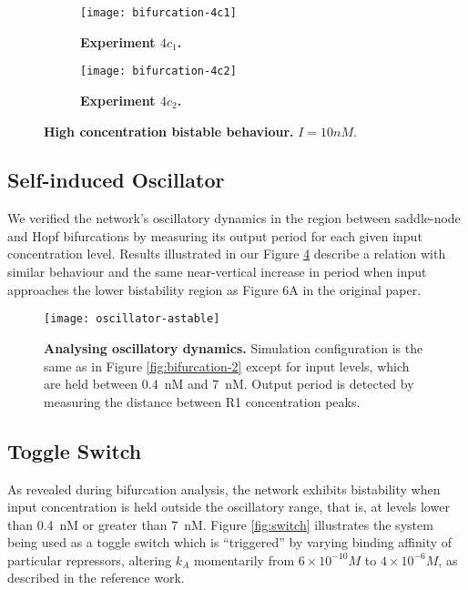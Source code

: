     \begin{figure}[!htb]
      \centering
      \begin{subfigure}[t]{0.45\textwidth}
        \centering
        \texttt{[image: bifurcation-4c1]}
        \caption{\textbf{Experiment $4c_{1}$.}}
        \label{fig:bifurcation-4c1}
      \end{subfigure}
      \hfill
      \begin{subfigure}[t]{0.45\textwidth}
        \centering
        \texttt{[image: bifurcation-4c2]}
        \caption{\textbf{Experiment $4c_{2}$.}}
        \label{fig:bifurcation-4c2}
      \end{subfigure}
      \caption{\textbf{High concentration bistable behaviour.} $I = 10 nM$.}
      \label{fig:bifurcation-4}
    \end{figure}


  \subsection{Self-induced Oscillator}

    We verified the network's oscillatory dynamics in the region between saddle-node and Hopf bifurcations by measuring its output period for each given input concentration level.
    Results illustrated in our Figure \ref{fig:oscillator-astable} describe a relation with similar behaviour and the same near-vertical increase in period when input approaches the lower bistability region as Figure 6A in the original paper.

    \begin{figure}[!htb]
      \centering
      \texttt{[image: oscillator-astable]}
      \caption{\textbf{Analysing oscillatory dynamics.} Simulation configuration is the same as in Figure \ref{fig:bifurcation-2} except for input levels, which are held between \SI{0.4}{\nano M} and \SI{7}{\nano M}. Output period is detected by measuring the distance between R1 concentration peaks.}
      \label{fig:oscillator-astable}
    \end{figure}


  \subsection{Toggle Switch}

    As revealed during bifurcation analysis, the network exhibits bistability when input concentration is held outside the oscillatory range, that is, at levels lower than \SI{0.4}{\nano M} or greater than \SI{7}{\nano M}.
    Figure \ref{fig:switch} illustrates the system being used as a toggle switch which is ``triggered'' by varying binding affinity of particular repressors, altering $k_A$ momentarily from $6 \times 10^{-10} M$ to $4 \times 10^{-6} M$, as described in the reference work.

